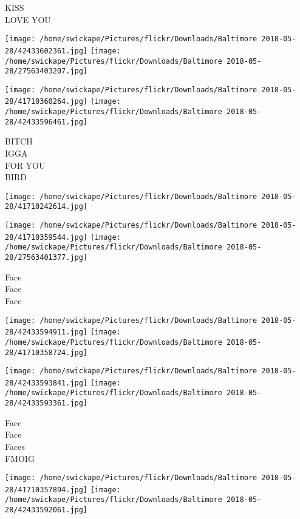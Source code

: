 \documentclass[10pt,letterpaper]{article}
\begin{document}
KISS\\
LOVE YOU\\
\pagebreak

\texttt{[image: /home/swickape/Pictures/flickr/Downloads/Baltimore 2018-05-28/42433602361.jpg]}
\texttt{[image: /home/swickape/Pictures/flickr/Downloads/Baltimore 2018-05-28/27563403207.jpg]}

\texttt{[image: /home/swickape/Pictures/flickr/Downloads/Baltimore 2018-05-28/41710360264.jpg]}
\texttt{[image: /home/swickape/Pictures/flickr/Downloads/Baltimore 2018-05-28/42433596461.jpg]}

BITCH\\
IGGA\\
FOR YOU\\
BIRD\\
\pagebreak

\texttt{[image: /home/swickape/Pictures/flickr/Downloads/Baltimore 2018-05-28/41710242614.jpg]}

\vspace{0.25in}
\texttt{[image: /home/swickape/Pictures/flickr/Downloads/Baltimore 2018-05-28/41710359544.jpg]}
\texttt{[image: /home/swickape/Pictures/flickr/Downloads/Baltimore 2018-05-28/27563401377.jpg]}

Face\\
Face\\
Face\\
\pagebreak

\texttt{[image: /home/swickape/Pictures/flickr/Downloads/Baltimore 2018-05-28/42433594911.jpg]}
\texttt{[image: /home/swickape/Pictures/flickr/Downloads/Baltimore 2018-05-28/41710358724.jpg]}

\texttt{[image: /home/swickape/Pictures/flickr/Downloads/Baltimore 2018-05-28/42433593841.jpg]}
\texttt{[image: /home/swickape/Pictures/flickr/Downloads/Baltimore 2018-05-28/42433593361.jpg]}

Face\\
Face\\
Faces\\
FMOIG\\
\pagebreak

\texttt{[image: /home/swickape/Pictures/flickr/Downloads/Baltimore 2018-05-28/41710357894.jpg]}
\texttt{[image: /home/swickape/Pictures/flickr/Downloads/Baltimore 2018-05-28/42433592061.jpg]}
\end{document}
